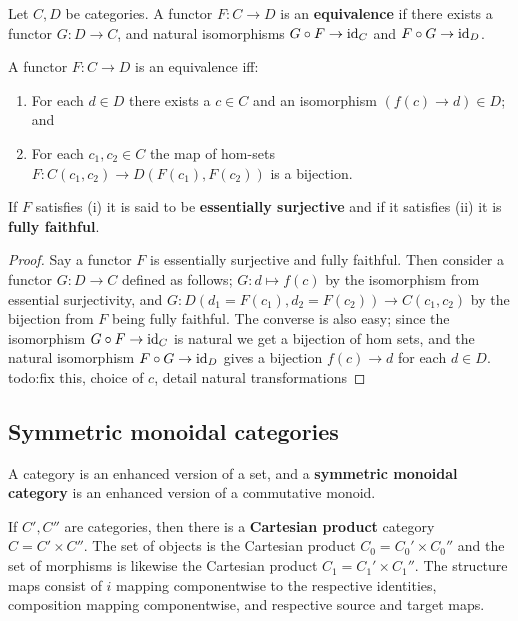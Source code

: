 \begin{definition}[]
    Let $C,D$ be categories. A functor $F \colon C \to D$ is an \textbf{equivalence} if there exists a functor $G \colon D \to C$, and natural isomorphisms $G \circ F \to  \operatorname{id}_C $ and $F \circ G \to \operatorname{id}_D$.
\end{definition}
\begin{prop}
    A functor $F \colon C \to D$ is an equivalence iff:
    \begin{enumerate}[label=(\roman*)]
    \setlength\itemsep{-.2em}
\item For each $d \in D$ there exists a $c \in C$ and an isomorphism $(f (c) \to d) \in D$; and
\item For each $c_1,c_2 \in C$ the map of hom-sets $F \colon C(c_1,c_2) \to D(F(c_1),F(c_2)) $ is a bijection.
    \end{enumerate}
\end{prop}
If $F$ satisfies (i) it is said to be \textbf{essentially surjective} and if it satisfies (ii) it is \textbf{fully faithful}.
\begin{proof}
    Say a functor $F$ is essentially surjective and fully faithful. Then consider a functor $G \colon D \to C$ defined as follows; $G \colon d \mapsto f(c) $ by the isomorphism from essential surjectivity, and $G \colon D(d_1=F(c_1),d_2=F(c_2)) \to C(c_1,c_2)$ by the bijection from $F$ being fully faithful. The converse is also easy; since the isomorphism $G \circ F \to \operatorname{id}_C$ is natural we get a bijection of hom sets, and the natural isomorphism $F \circ G \to \operatorname{id}_D$ gives a bijection $f(c) \to d$ for each $d \in D$. {\color{red}todo:fix this, choice of $c$, detail natural transformations} 
\end{proof}

\subsection{Symmetric monoidal categories}
A category is an enhanced version of a set, and a \textbf{symmetric monoidal category} is an enhanced version of a commutative monoid.

\begin{definition}[]
    If $C',C''$ are categories, then there is a \textbf{Cartesian product} category $C= C' \times C''$. The set of objects is the Cartesian product $C_0=C_0' \times C_0''$ and the set of morphisms is likewise the Cartesian product $C_1=C_1' \times C_1''$. The structure maps consist of $i$ mapping componentwise to the respective identities, composition mapping componentwise, and respective source and target maps.
\end{definition}

